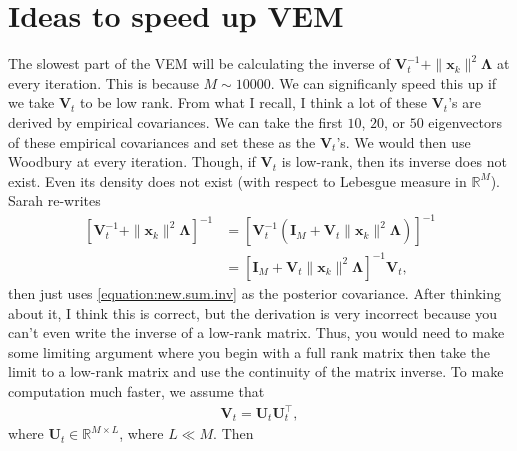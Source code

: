 \documentclass[11pt,authoryear]{article}
\newcommand{\bs}[1]{\boldsymbol{#1}}
\begin{document}
\section{Ideas to speed up VEM}
The slowest part of the VEM will be calculating the inverse of
$\bs{V}_t^{-1} + \|\bs{x}_k\|^2\bs{\Lambda}$ at every iteration. This
is because $M \sim 10000$. We can significanly speed this up if we
take $\bs{V}_t$ to be low rank. From what I recall, I think a lot of
these $\bs{V}_t$'s are derived by empirical covariances. We can take
the first $10$, $20$, or $50$ eigenvectors of these empirical
covariances and set these as the $\bs{V}_t$'s. We would then use
Woodbury at every iteration. Though, if $\bs{V}_t$ is low-rank, then
its inverse does not exist. Even its density does not exist (with
respect to Lebesgue measure in $\mathbb{R}^M$). Sarah re-writes
\begin{align}
\left[\bs{V}_t^{-1} + \|\bs{x}_k\|^2\bs{\Lambda}\right]^{-1} &=\left[\bs{V}_t^{-1}\left(\bs{I}_M + \bs{V}_t\|\bs{x}_k\|^2\bs{\Lambda}\right)\right]^{-1}\\
\label{equation:new.sum.inv}&=\left[\bs{I}_M + \bs{V}_t\|\bs{x}_k\|^2\bs{\Lambda}\right]^{-1}\bs{V}_t,
\end{align}
then just uses \eqref{equation:new.sum.inv} as the posterior
covariance. After thinking about it, I think this is correct, but the
derivation is very incorrect because you can't even write the inverse
of a low-rank matrix. Thus, you would need to make some limiting
argument where you begin with a full rank matrix then take the limit
to a low-rank matrix and use the continuity of the matrix inverse. To
make computation much faster, we assume that
\begin{align}
\bs{V}_t = \bs{U}_t\bs{U}_t^{\intercal},
\end{align}
where $\bs{U}_t \in \mathbb{R}^{M \times L}$, where $L \ll M$. Then
\end{document}
